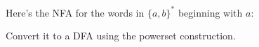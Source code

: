 Here's the NFA for the words in $\{a, b\}^*$ beginning with $a$: 



Convert it to a DFA using the powerset construction.
